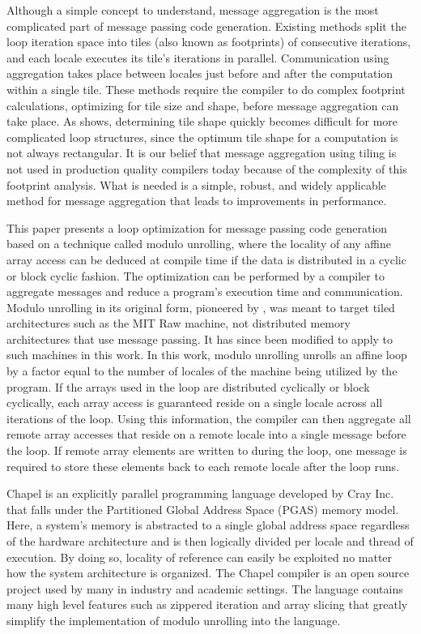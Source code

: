 Although a simple concept to understand, message aggregation is the most complicated part of message passing code generation. Existing methods \cite{goumas2006message, xue1997communication} split the loop iteration space into tiles (also known as footprints) of consecutive iterations, and each locale executes its tile's iterations in parallel. Communication using aggregation takes place between locales just before and after the computation within a single tile. These methods require the compiler to do complex footprint calculations, optimizing for tile size and shape, before message aggregation can take place. As \cite{ramanujam1992tiling} shows, determining tile shape quickly becomes difficult for more complicated loop structures, since the optimum tile shape for a computation is not always rectangular. It is our belief that message aggregation using tiling is not used in production quality compilers today because of the complexity of this footprint analysis. What is needed is a simple, robust, and widely applicable method for message aggregation that leads to improvements in performance. 

This paper presents a loop optimization for message passing code generation based on a technique called modulo unrolling, where the locality of any affine array access can be deduced at compile time if the data is distributed in a cyclic or block cyclic fashion. The optimization can be performed by a compiler to aggregate messages and reduce a program's execution time and communication. Modulo unrolling in its original form, pioneered by \cite{barua1999maps}, was meant to target tiled architectures such as the MIT Raw machine, not distributed memory architectures that use message passing. It has since been modified to apply to such machines in this work. In this work, modulo unrolling unrolls an affine loop by a factor equal to the number of locales of the machine being utilized by the program. If the arrays used in the loop are distributed cyclically or block cyclically, each array access is guaranteed reside on a single locale across all iterations of the loop. Using this information, the compiler can then aggregate all remote array accesses that reside on a remote locale into a single message before the loop. If remote array elements are written to during the loop, one message is required to store these elements back to each remote locale after the loop runs. 

Chapel is an explicitly parallel programming language developed by Cray Inc. that falls under the Partitioned Global Address Space (PGAS) memory model. Here, a system's memory is abstracted to a single global address space regardless of the hardware architecture and is then logically divided per locale and thread of execution. By doing so, locality of reference can easily be exploited no matter how the system architecture is organized. The Chapel compiler is an open source project used by many in industry and academic settings. The language contains many high level features such as zippered iteration and array slicing that greatly simplify the implementation of modulo unrolling into the language.

